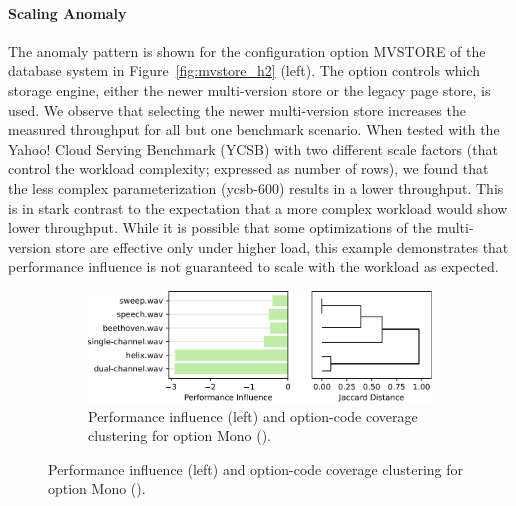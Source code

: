 {{{{\paragraph{Scaling Anomaly} The anomaly pattern is shown for the configuration option \textsf{MVSTORE} of the database system \htwo in Figure~\ref{fig:mvstore_h2} (left). The option controls which storage engine, either the newer multi-version store or the legacy page store, is used. We observe that selecting the newer multi-version store increases the measured throughput for all but one benchmark scenario. When tested with the Yahoo! Cloud Serving Benchmark (YCSB) with two different scale factors (that control the workload complexity; expressed as number of rows), we found that the less complex parameterization (\textsf{ycsb-600}) results in a lower throughput. This is in stark contrast to the expectation that a more complex workload would show lower throughput. While it is possible that some optimizations of the multi-version store are effective only under higher load, this example demonstrates that performance influence is not guaranteed to scale with the workload as expected. 

\vspace{1mm}

}

\begin{figure}

	\begin{subfigure}{\linewidth}
		\centering
		\includegraphics[width=0.97\linewidth]{images/Mono.pdf}
		\caption{Performance influence (left) and option-code coverage clustering for option \textsf{Mono} (\jumper).}
		\label{fig:mono_jump3r}
	\end{subfigure}
	

\end{figure}}}}
